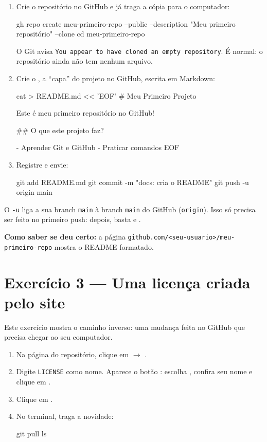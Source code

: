 \begin{enumerate}
  \item Crie o repositório no GitHub e já traga a cópia para o computador:
\begin{bashcode}
gh repo create meu-primeiro-repo --public --description "Meu primeiro repositório" --clone
cd meu-primeiro-repo
\end{bashcode}
  O Git avisa \texttt{You appear to have cloned an empty repository}. É
  normal: o repositório ainda não tem nenhum arquivo.

  \item Crie o , a \enquote{capa} do projeto no GitHub, escrita
        em Markdown:
\begin{bashcode}
cat > README.md << 'EOF'
# Meu Primeiro Projeto

Este é meu primeiro repositório no GitHub!

## O que este projeto faz?

- Aprender Git e GitHub
- Praticar comandos
EOF
\end{bashcode}

  \item Registre e envie:
\begin{bashcode}
git add README.md
git commit -m "docs: cria o README"
git push -u origin main
\end{bashcode}
\end{enumerate}

\begin{conceito}
O \texttt{-u} liga a sua branch \texttt{main} à branch \texttt{main} do
GitHub (\texttt{origin}). Isso só precisa ser feito no primeiro push: depois,
basta  e .
\end{conceito}

\textbf{Como saber se deu certo:} a página
\texttt{github.com/<seu-usuario>/meu-primeiro-repo} mostra o README
formatado.

\section{Exercício 3 — Uma licença criada pelo site}

Este exercício mostra o caminho inverso: uma mudança feita no GitHub que
precisa chegar ao seu computador.

\begin{enumerate}
  \item Na página do repositório, clique em  \(\rightarrow\)
        .
  \item Digite \texttt{LICENSE} como nome. Aparece o botão
        : escolha ,
        confira seu nome e clique em .
  \item Clique em .
  \item No terminal, traga a novidade:
\begin{bashcode}
git pull
ls
\end{bashcode}
\end{enumerate}

